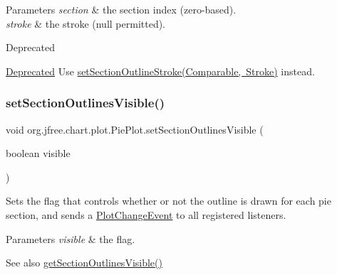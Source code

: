 \begin{DoxyParams}{Parameters}
{\em section} & the section index (zero-\/based). \\
\hline
{\em stroke} & the stroke ({\ttfamily null} permitted).\\
\hline
\end{DoxyParams}
\begin{DoxyRefDesc}{Deprecated}
\item[\mbox{\hyperlink{deprecated__deprecated000077}{Deprecated}}]Use \mbox{\hyperlink{classorg_1_1jfree_1_1chart_1_1plot_1_1_pie_plot_acd082f96925c46a66807857e4314b9ae}{set\+Section\+Outline\+Stroke(\+Comparable, Stroke)}} instead. \end{DoxyRefDesc}
\mbox{\label{classorg_1_1jfree_1_1chart_1_1plot_1_1_pie_plot_a1bd6cc215c5393df4f17f499c92b08bf}} 
\subsubsection{\texorpdfstring{set\+Section\+Outlines\+Visible()}{setSectionOutlinesVisible()}}
{\footnotesize\ttfamily void org.\+jfree.\+chart.\+plot.\+Pie\+Plot.\+set\+Section\+Outlines\+Visible (\begin{DoxyParamCaption}\item[{boolean}]{visible }\end{DoxyParamCaption})}

Sets the flag that controls whether or not the outline is drawn for each pie section, and sends a \mbox{\hyperlink{}{Plot\+Change\+Event}} to all registered listeners.


\begin{DoxyParams}{Parameters}
{\em visible} & the flag.\\
\hline
\end{DoxyParams}
\begin{DoxySeeAlso}{See also}
\mbox{\hyperlink{classorg_1_1jfree_1_1chart_1_1plot_1_1_pie_plot_a071003f5ce49b26446c76598ce3b63f6}{get\+Section\+Outlines\+Visible()}} 
\end{DoxySeeAlso}
\mbox{\label{classorg_1_1jfree_1_1chart_1_1plot_1_1_pie_plot_a201122096ae318cb6e976a7a9596c500}} 
